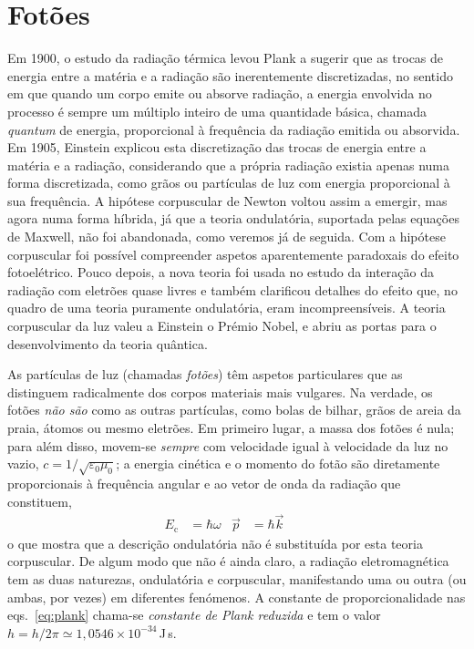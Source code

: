 \section{Fotões}
Em 1900, o estudo da radiação térmica levou Plank a sugerir que as trocas de
energia entre a matéria e a radiação são inerentemente discretizadas, no sentido
em que quando um corpo emite ou absorve radiação, a energia envolvida no
processo é sempre um múltiplo inteiro de uma quantidade básica, chamada
\emph{quantum} de energia, proporcional à frequência da radiação emitida ou
absorvida. Em 1905, Einstein explicou esta discretização das trocas de energia
entre a matéria e a radiação, considerando que a própria radiação existia
apenas numa forma discretizada, como grãos ou partículas de luz com energia
proporcional à sua frequência. A hipótese corpuscular de Newton voltou assim a
emergir, mas agora numa forma híbrida, já que a teoria ondulatória, suportada
pelas equações de Maxwell, não foi abandonada, como veremos já de seguida. Com a
hipótese corpuscular foi possível compreender aspetos aparentemente paradoxais
do efeito fotoelétrico. Pouco depois, a nova teoria foi usada no estudo da
interação da radiação com eletrões quase livres e também clarificou detalhes
do efeito que, no quadro de uma teoria puramente ondulatória, eram
incompreensíveis. A teoria corpuscular da luz valeu a Einstein o Prémio Nobel, e
abriu as portas para o desenvolvimento da teoria quântica.


As partículas de luz (chamadas \emph{fotões}) têm aspetos particulares que as
distinguem radicalmente dos corpos materiais mais vulgares.  Na verdade, os
fotões \emph{não são} como as outras partículas, como bolas de bilhar, grãos de
areia da praia, átomos ou mesmo eletrões. Em primeiro lugar, a massa dos fotões
é nula; para além disso, movem-se \emph{sempre} com velocidade igual à
velocidade da luz no vazio, $c=1/\sqrt{\varepsilon_0\mu_0}$; a energia cinética
e o momento do fotão são diretamente proporcionais à frequência angular e ao
vetor de onda da radiação que constituem,
\begin{align}\label{eq:plank}
    E_\text{c}&=\hbar\omega&\vec p&=\hbar \vec k\qquad
\end{align}
o que mostra que a descrição ondulatória não é substituída por esta teoria
corpuscular. De algum modo que não é ainda claro, a radiação eletromagnética
tem as duas naturezas, ondulatória e corpuscular, manifestando uma ou outra (ou
ambas, por vezes) em diferentes fenómenos.
A constante de proporcionalidade nas eqs.~\eqref{eq:plank} chama-se
\emph{constante de Plank reduzida} e tem o valor
$h=h/2\pi\simeq1,0546\times10^{-34}$\,J\,s. 

